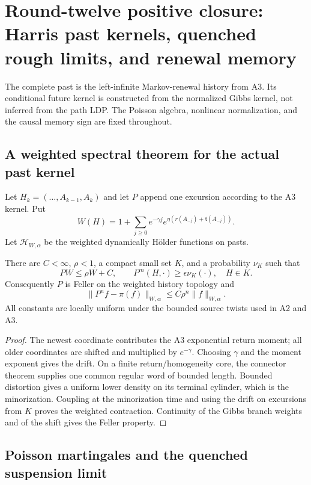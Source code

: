 \section{Round-twelve positive closure: Harris past kernels, quenched rough limits, and renewal memory}
\label{sec:r12-a4}

The complete past is the left-infinite Markov-renewal history from A3.  Its
conditional future kernel is constructed from the normalized Gibbs kernel,
not inferred from the path LDP.  The Poisson algebra, nonlinear normalization,
and the causal memory sign are fixed throughout.

\subsection{A weighted spectral theorem for the actual past kernel}

Let $H_k=(\ldots,A_{k-1},A_k)$ and let $P$ append one excursion according to
the A3 kernel.  Put
\[
 W(H)=1+\sum_{j\ge0}e^{-\gamma j}
       e^{\eta(r(A_{-j})+\mathfrak t(A_{-j}))}.
\]
Let $\mathcal H_{W,\alpha}$ be the weighted dynamically H\"older functions on
pasts.

\begin{theorem}
\label{thm:r12-a4-harris}
There are $C<\infty$, $\rho<1$, a compact small set $K$, and a probability
$\nu_K$ such that
\[
 PW\le\rho W+C,
 \qquad
 P^m(H,\cdot)\ge\epsilon\nu_K(\cdot),\quad H\in K.
\]
Consequently $P$ is Feller on the weighted history topology and
\[
 \|P^nf-\pi(f)\|_{W,\alpha}
 \le C\rho^n\|f\|_{W,\alpha}.
\]
All constants are locally uniform under the bounded source twists used in A2
and A3.
\end{theorem}

\begin{proof}
The newest coordinate contributes the A3 exponential return moment; all older
coordinates are shifted and multiplied by $e^{-\gamma}$.  Choosing $\gamma$
and the moment exponent gives the drift.  On a finite return/homogeneity core,
the connector theorem supplies one common regular word of bounded length.
Bounded distortion gives a uniform lower density on its terminal cylinder,
which is the minorization.  Coupling at the minorization time and using the
drift on excursions from $K$ proves the weighted contraction.  Continuity of
the Gibbs branch weights and of the shift gives the Feller property.
\end{proof}

\subsection{Poisson martingales and the quenched suspension limit}

